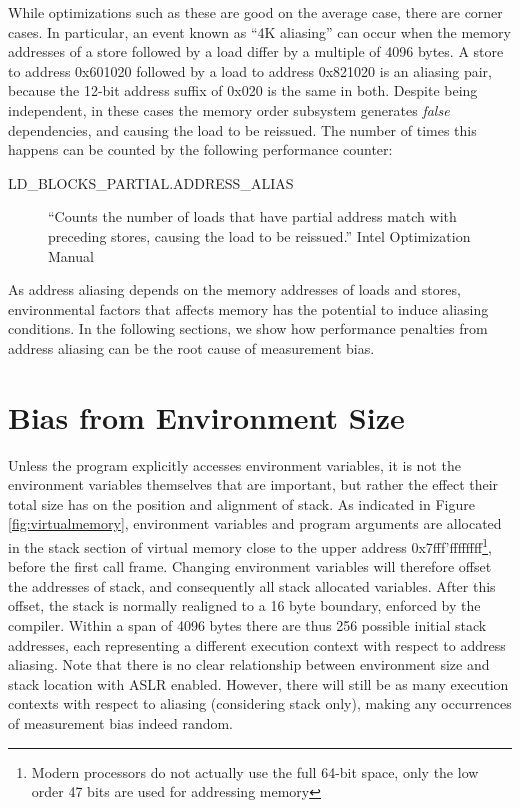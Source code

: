 \documentclass[prodmode,acmtaco]{acmsmall}
\begin{document}
While optimizations such as these are good on the average case, there are corner cases. 
In particular, an event known as ``4K aliasing'' can occur when the memory addresses of a store followed by a load differ by a multiple of 4096 bytes.
A store to address 0x601020 followed by a load to address 0x821020 is an aliasing pair, because the 12-bit address suffix of 0x020 is the same in both. 
Despite being independent, in these cases the memory order subsystem generates \emph{false} dependencies, and causing the load to be reissued.
The number of times this happens can be counted by the following performance counter:
\begin{description}
  \item[{\small LD\_BLOCKS\_PARTIAL.ADDRESS\_ALIAS}] ``Counts the number of loads that have partial address match with preceding stores, causing the load to be reissued.'' Intel Optimization Manual~\citeyear[B.3.4.4]{OptimizationManual}
\end{description}

As address aliasing depends on the memory addresses of loads and stores, environmental factors that affects memory has the potential to induce aliasing conditions.
In the following sections, we show how performance penalties from address aliasing can be the root cause of measurement bias.


\section{Bias from Environment Size}
\label{sec:environment}
Unless the program explicitly accesses environment variables, it is not the environment variables themselves that are important, but rather the effect their total size has on the position and alignment of stack.
As indicated in Figure \ref{fig:virtualmemory}, environment variables and program arguments are allocated in the stack section of virtual memory close to the upper address 0x7fff'ffffffff\footnote{Modern processors do not actually use the full 64-bit space, only the low order 47 bits are used for addressing memory}, before the first call frame.
Changing environment variables will therefore offset the addresses of stack, and consequently all stack allocated variables.
After this offset, the stack is normally realigned to a 16 byte boundary, enforced by the compiler.
Within a span of 4096 bytes there are thus 256 possible initial stack addresses, each representing a different execution context with respect to address aliasing. 
Note that there is no clear relationship between environment size and stack location with ASLR enabled.
However, there will still be as many execution contexts with respect to aliasing (considering stack only), making any occurrences of measurement bias indeed random.
\end{document}
